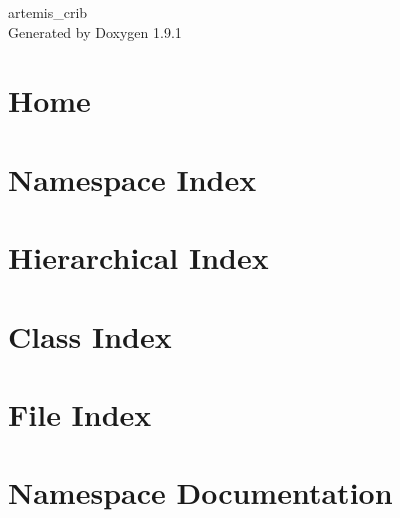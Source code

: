 \let\mypdfximage\pdfximage\def\pdfximage{\immediate\mypdfximage}\documentclass[twoside]{book}
\newcommand{\+}{\discretionary{\mbox{\scriptsize$\hookleftarrow$}}{}{}}
\newcommand{\clearemptydoublepage}{%
  \newpage{\pagestyle{empty}\cleardoublepage}%
}
\begin{document}
\raggedbottom

\hypersetup{pageanchor=false,
             bookmarksnumbered=true,
             pdfencoding=unicode
            }
\begin{titlepage}
\vspace*{7cm}
\begin{center}%
{\Large artemis\+\_\+crib }\\
\vspace*{1cm}
{\large Generated by Doxygen 1.9.1}\\
\end{center}
\end{titlepage}
\clearemptydoublepage
{}
\tableofcontents
\clearemptydoublepage
{}
\hypersetup{pageanchor=true}

\chapter{Home}
\label{index}\hypertarget{index}{}
\chapter{Namespace Index}

\chapter{Hierarchical Index}

\chapter{Class Index}

\chapter{File Index}

\chapter{Namespace Documentation}


\end{document}
